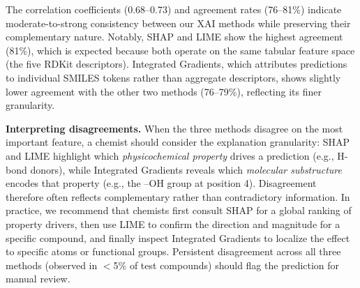\documentclass[preprint,12pt]{elsarticle}
\begin{document}
\begin{table}[H]
\centering
\caption{XAI Method Consistency Analysis}
\vspace{0.7em}

\label{tab:xai_consistency}
\end{table}


The correlation coefficients (0.68--0.73) and agreement rates (76--81\%) indicate moderate-to-strong consistency between our XAI methods while preserving their complementary nature. Notably, SHAP and LIME show the highest agreement (81\%), which is expected because both operate on the same tabular feature space (the five RDKit descriptors). Integrated Gradients, which attributes predictions to individual SMILES tokens rather than aggregate descriptors, shows slightly lower agreement with the other two methods (76--79\%), reflecting its finer granularity.

\textbf{Interpreting disagreements.}
When the three methods disagree on the most important feature, a chemist should consider the explanation granularity: SHAP and LIME highlight which \emph{physicochemical property} drives a prediction (e.g., H-bond donors), while Integrated Gradients reveals which \emph{molecular substructure} encodes that property (e.g., the --OH group at position 4). Disagreement therefore often reflects complementary rather than contradictory information. In practice, we recommend that chemists first consult SHAP for a global ranking of property drivers, then use LIME to confirm the direction and magnitude for a specific compound, and finally inspect Integrated Gradients to localize the effect to specific atoms or functional groups. Persistent disagreement across all three methods (observed in $<$5\% of test compounds) should flag the prediction for manual review.
\end{document}
